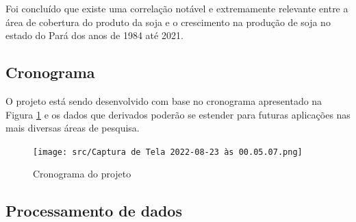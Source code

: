 \newpage


Foi concluído que existe uma correlação notável e extremamente relevante entre a área de cobertura do produto da soja e o crescimento na produção de soja no estado do Pará dos anos de 1984 até 2021.

\subsection{Cronograma}

O projeto está sendo desenvolvido com base no cronograma apresentado na Figura \ref{fig:crono} e os dados que derivados poderão se estender para futuras aplicações nas mais diversas áreas de pesquisa. 

\begin{figure}[hbt!]
    \centering
    \texttt{[image: src/Captura de Tela 2022-08-23 às 00.05.07.png]}
    \caption{Cronograma do projeto}
    \label{fig:crono}
\end{figure}

\subsection{Processamento de dados}